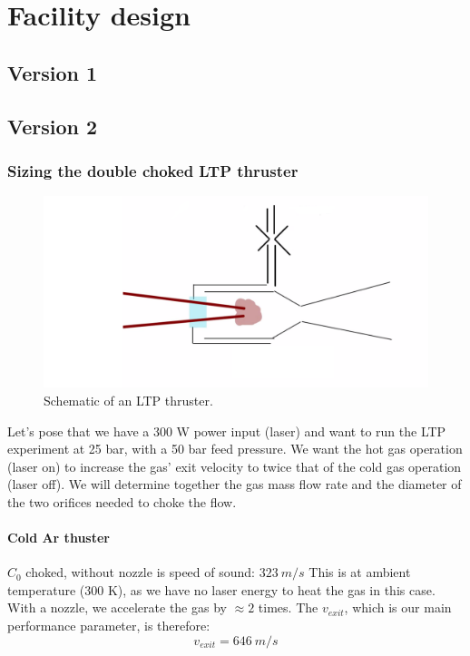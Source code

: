 \chapter{Facility design}
    \section{Version 1} \label{sec:design_v1}

    \section{Version 2} \label{sec:design_v2}

        \subsection{Sizing the double choked LTP thruster}
            \begin{figure}[h]
            \centering
            \includegraphics[width=0.8\linewidth]{assets/3 design/double choked sizing.png}
            \caption{\label{fig:frog}Schematic of an LTP thruster.}
            \end{figure}
            
            Let's pose that we have a 300 W power input (laser) and want to run the LTP experiment at 25 bar, with a 50 bar feed pressure. We want the hot gas operation (laser on) to increase the gas' exit velocity to twice that of the cold gas operation (laser off). We will determine together the gas mass flow rate and the diameter of the two orifices needed to choke the flow.
            
            \subsubsection{Cold Ar thuster}
            $C_0$ choked, without nozzle is speed of sound: $323 \:m/s$ This is at ambient temperature (300 K), as we have no laser energy to heat the gas in this case. With a nozzle, we accelerate the gas by $\approx 2$ times. The $v_{exit}$, which is our main performance parameter, is therefore: 
            \[v_{exit} = 646\: m/s\]
            
